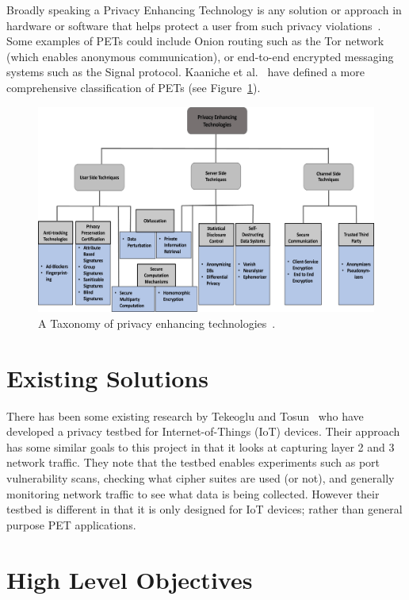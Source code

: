 \documentclass[
    author={Jacob Daniel Halsey},
    supervisor={Prof. Awais Rashid},
    degree={BSc},
    title={Building a Testbed for Evaluating Privacy Enhancing Technologies  (PETs)},
    subtitle={},
    type={software development},
    year={2021}
]{dissertation}
\begin{document}
Broadly speaking a Privacy Enhancing Technology is any solution or approach in hardware or software that helps
protect a user from such privacy violations~\cite{buckley_pets}. Some examples of PETs could include 
Onion routing such as the Tor network (which enables anonymous communication), or
end-to-end encrypted messaging systems such as the Signal protocol. 
Kaaniche et al.~\cite{kaaniche_2020_privacy} have defined a more comprehensive classification of PETs
 (see Figure~\ref{pet_taxonomy}).

\begin{figure}
	\centering
	\includegraphics{img/pet_taxonomy}
	\caption{A Taxonomy of privacy enhancing technologies~\cite{kaaniche_2020_privacy}.}
	\label{pet_taxonomy}
\end{figure}

\section{Existing Solutions}

There has been some existing research by Tekeoglu and Tosun~\cite{tekeoglu_2016_testbed} who have developed 
a privacy testbed for Internet-of-Things (IoT) devices. Their approach has some similar goals to this project 
in that it looks at capturing layer 2 and 3 network traffic. They note that the testbed enables experiments such
as port vulnerability scans, checking what cipher suites are used (or not), and generally monitoring 
network traffic to see what data is being collected. However their testbed is different in that it is only designed
for IoT devices; rather than general purpose PET applications.

\section{High Level Objectives}
\end{document}
